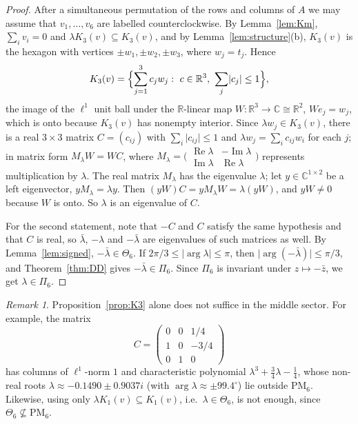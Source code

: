 \documentclass[11pt]{amsart}
\theoremstyle{definition}
\theoremstyle{remark}
\newtheorem{remark}[theorem]{Remark}
\newcommand{\C}{\mathbb{C}}
\newcommand{\R}{\mathbb{R}}
\renewcommand{\Im}{\operatorname{Im}}
\renewcommand{\Re}{\operatorname{Re}}
\newcommand{\PM}{\mathrm{PM}}
\begin{document}
\begin{proof}
After a simultaneous permutation of the rows and columns of $A$ we may assume that $v_1,\dots,v_6$ are labelled counterclockwise. By Lemma~\ref{lem:Km}, $\sum_iv_i=0$ and $\lambda K_3(v)\subseteq K_3(v)$, and by Lemma~\ref{lem:structure}(b), $K_3(v)$ is the hexagon with vertices $\pm w_1,\pm w_2,\pm w_3$, where $w_j=t_j$. Hence
\[
K_3(v)=\Bigl\{\sum_{j=1}^3c_jw_j:\ c\in\R^3,\ \sum_j\lvert c_j\rvert\le1\Bigr\},
\]
the image of the $\ell^1$ unit ball under the $\R$-linear map $W:\R^3\to\C\cong\R^2$, $We_j=w_j$, which is onto because $K_3(v)$ has nonempty interior. Since $\lambda w_j\in K_3(v)$, there is a real $3\times3$ matrix $C=(c_{ij})$ with $\sum_i\lvert c_{ij}\rvert\le1$ and $\lambda w_j=\sum_ic_{ij}w_i$ for each $j$; in matrix form $M_\lambda W=WC$, where $M_\lambda=\bigl(\begin{smallmatrix}\Re\lambda&-\Im\lambda\\ \Im\lambda&\Re\lambda\end{smallmatrix}\bigr)$ represents multiplication by $\lambda$. The real matrix $M_\lambda$ has the eigenvalue $\lambda$; let $y\in\C^{1\times2}$ be a left eigenvector, $yM_\lambda=\lambda y$. Then $(yW)C=yM_\lambda W=\lambda(yW)$, and $yW\neq0$ because $W$ is onto. So $\lambda$ is an eigenvalue of $C$.

For the second statement, note that $-C$ and $C$ satisfy the same hypothesis and that $C$ is real, so $\bar\lambda$, $-\lambda$ and $-\bar\lambda$ are eigenvalues of such matrices as well. By Lemma~\ref{lem:signed}, $-\bar\lambda\in\Theta_6$. If $2\pi/3\le\lvert\arg\lambda\rvert\le\pi$, then $\lvert\arg(-\bar\lambda)\rvert\le\pi/3$, and Theorem~\ref{thm:DD} gives $-\bar\lambda\in\Pi_6$. Since $\Pi_6$ is invariant under $z\mapsto-\bar z$, we get $\lambda\in\Pi_6$.
\end{proof}

\begin{remark}\label{rem:K3notenough}
Proposition~\ref{prop:K3} alone does not suffice in the middle sector. For example, the matrix
\[
C=\begin{pmatrix}0&0&1/4\\ 1&0&-3/4\\ 0&1&0\end{pmatrix}
\]
has columns of $\ell^1$-norm $1$ and characteristic polynomial $\lambda^3+\frac34\lambda-\frac14$, whose non-real roots $\lambda\approx-0.1490\pm0.9037i$ (with $\arg\lambda\approx\pm99.4^\circ$) lie outside $\PM_6$. Likewise, using only $\lambda K_1(v)\subseteq K_1(v)$, i.e.\ $\lambda\in\Theta_6$, is not enough, since $\Theta_6\not\subseteq\PM_6$.
\end{remark}
\end{document}
